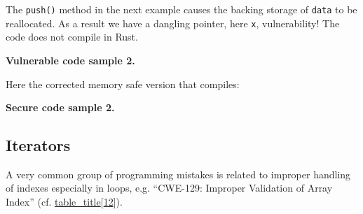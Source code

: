 The \texttt{push()} method in the next example causes the backing
storage of \texttt{data} to be reallocated. As a result we have a
dangling pointer, here \texttt{x}, vulnerability! The code does not
compile in Rust.

\textbf{Vulnerable code sample 2.}

\begin{Shaded}
\begin{Highlighting}[]
  \NormalTok{[}\NormalTok{, }\NormalTok{, }\NormalTok{];}
 \NormalTok{x = &data[}\NormalTok{];}
\NormalTok{);}
\NormalTok{(}
\end{Highlighting}
\end{Shaded}

Here the corrected memory safe version that compiles:

\textbf{Secure code sample 2.}

\begin{Shaded}
\begin{Highlighting}[]
  \NormalTok{[}\NormalTok{, }\NormalTok{, }\NormalTok{];}
\NormalTok{);}
 \NormalTok{x = &data[}\NormalTok{];}
\NormalTok{(}
\end{Highlighting}
\end{Shaded}

\subsection{Iterators}\label{_iterators}

A very common group of programming mistakes is related to improper
handling of indexes especially in loops, e.g. ``CWE-129: Improper
Validation of Array Index'' (cf.
\protect\hyperlink{c-memory-safety-bugs2}{table\_title}{[}\protect\hyperlink{mitrecorporation2016}{12}{]}).

